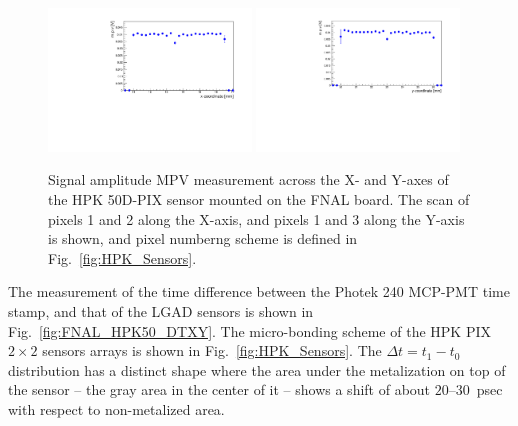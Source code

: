 \documentclass[preprint,1p]{elsarticle}
\begin{document}
\begin{figure}[htbp] 
\centering
\includegraphics[width=0.48\textwidth]{figs/FNALBoard_HPK50DPix_Run847-891/MPV_vs_X_Ch4_5.pdf} 
\includegraphics[width=0.48\textwidth]{figs/FNALBoard_HPK50DPix_Run847-891/MPV_vs_Y_Ch3_4.pdf} 
\caption{Signal amplitude MPV measurement across the X- and Y-axes of the HPK 50D-PIX sensor mounted on the FNAL board. The scan of pixels 1 and 2 along the X-axis, and pixels 1 and 3 along the Y-axis is shown, and pixel numberng scheme is defined in Fig.~\ref{fig:HPK_Sensors}.} 
\label{fig:FNAL_HPK50_MPVXY} 
\end{figure} 



The measurement of the time difference between the Photek 240 MCP-PMT time stamp,
and that of the LGAD sensors is shown in Fig.~\ref{fig:FNAL_HPK50_DTXY}. The
micro-bonding scheme of the HPK PIX $2\times 2$ sensors arrays is shown in
Fig.~\ref{fig:HPK_Sensors}. The $\Delta t = t_{1}-t_{0}$ distribution has a distinct shape
where the area under the metalization on top of the sensor -- the gray
area in the center of it -- shows a shift of
about $20$--$30$~psec with respect to non-metalized area. 
\end{document}
